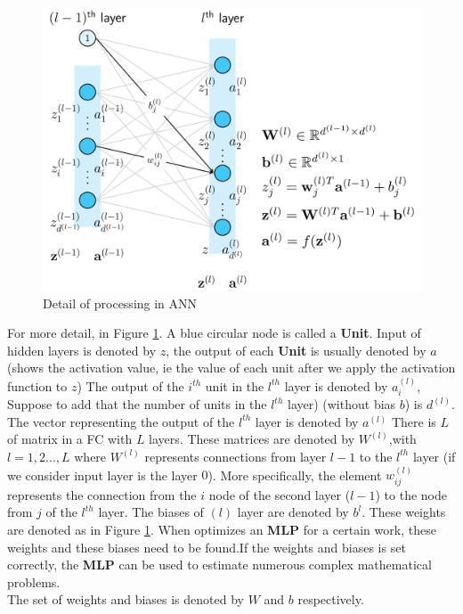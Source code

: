 \begin{center}
	\begin{figure}[H]
		\centering
		\includegraphics[width=0.75\columnwidth]{images/chap2/mlp_notation.png}
		\caption{Detail of processing in ANN}
		\label{chap2:neural_net_detail}
	\end{figure}
\end{center}
\vspace{-1cm}
For more detail, in Figure \ref{chap2:neural_net_detail}. A blue circular node is called a \textbf{Unit}. Input of hidden layers is denoted by $z$, the output of each \textbf{Unit} is usually denoted by $a$
(shows the activation value, ie the value of each unit after we apply the activation function to $z$) The output of the $i^{th}$ unit in the $l^{th}$ layer is denoted by $a_{i}^{(l)}$, Suppose to add that the number of units in the $l^{th}$ layer) (without bias $b$) is $d^{(l)}$. The vector representing the output of the $l^{th}$ layer is denoted by $a^{(l)}$
There is $L$ of matrix in a FC with $L$ layers. These matrices are denoted by $W^{(l)}$,with $l = 1,2 ..., L$ where $W^{(l)}$ represents connections from layer $l-1$ to the $l^{th}$ layer (if we consider input layer is the layer $0$). More specifically, the element $w_{ij}^{(l)}$ represents the connection from the $i$ node of the second layer ($ l-1 $) to the node from $j$ of the $l^{th}$ layer. The biases of $(l)$ layer are denoted by $b^{l}$. These weights are denoted as in Figure \ref{chap2:neural_net_detail}. When optimizes an \textbf{MLP} for a certain work, these weights and these biases need to be found.If the weights and biases is set correctly, the \textbf{MLP} can be used to estimate numerous complex mathematical problems.\\
The set of weights and biases is denoted by $W$ and $b$ respectively.

